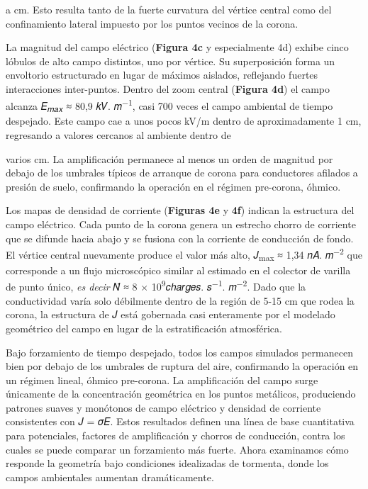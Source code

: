 \documentclass[
]{article}
\begin{document}
a cm. Esto resulta tanto de la fuerte curvatura del vértice central como
del confinamiento lateral impuesto por los puntos vecinos de la corona.

La magnitud del campo eléctrico (\textbf{Figura 4c} y especialmente 4d)
exhibe cinco lóbulos de alto campo distintos, uno por vértice. Su
superposición forma un envoltorio estructurado en lugar de máximos
aislados, reflejando fuertes interacciones inter-puntos. Dentro del zoom
central (\textbf{Figura 4d}) el campo alcanza 𝐸\textsubscript{𝑚𝑎𝑥} ≈
80,9 𝑘𝑉. 𝑚\textsuperscript{−1}, casi 700 veces el campo ambiental de
tiempo despejado. Este campo cae a unos pocos kV/m dentro de
aproximadamente 1 cm, regresando a valores cercanos al ambiente dentro
de

varios cm. La amplificación permanece al menos un orden de magnitud por
debajo de los umbrales típicos de arranque de corona para conductores
afilados a presión de suelo, confirmando la operación en el régimen
pre-corona, óhmico.

Los mapas de densidad de corriente (\textbf{Figuras 4e} y \textbf{4f})
indican la estructura del campo eléctrico. Cada punto de la corona
genera un estrecho chorro de corriente que se difunde hacia abajo y se
fusiona con la corriente de conducción de fondo. El vértice central
nuevamente produce el valor más alto, 𝐽\textsubscript{max} ≈ 1,34 𝑛𝐴.
𝑚\textsuperscript{−2} que corresponde a un flujo microscópico similar al
estimado en el colector de varilla de punto único, \emph{es decir} 𝑁̇ ≈ 8
× 10\textsuperscript{9}𝑐ℎ𝑎𝑟𝑔𝑒𝑠. 𝑠\textsuperscript{−1}.
𝑚\textsuperscript{−2}. Dado que la conductividad varía solo débilmente
dentro de la región de 5-15 cm que rodea la corona, la estructura de
\textbar 𝐽\textbar{} está gobernada casi enteramente por el modelado
geométrico del campo en lugar de la estratificación atmosférica.

Bajo forzamiento de tiempo despejado, todos los campos simulados
permanecen bien por debajo de los umbrales de ruptura del aire,
confirmando la operación en un régimen lineal, óhmico pre-corona. La
amplificación del campo surge únicamente de la concentración geométrica
en los puntos metálicos, produciendo patrones suaves y monótonos de
campo eléctrico y densidad de corriente consistentes con 𝐽 = 𝜎𝐸. Estos
resultados definen una línea de base cuantitativa para potenciales,
factores de amplificación y chorros de conducción, contra los cuales se
puede comparar un forzamiento más fuerte. Ahora examinamos cómo responde
la geometría bajo condiciones idealizadas de tormenta, donde los campos
ambientales aumentan dramáticamente.
\end{document}
